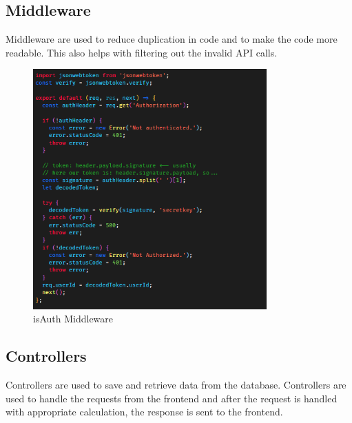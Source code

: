     \subsection{Middleware}
        Middleware are used to reduce duplication in code and to make the code more readable. This also helps with filtering out the invalid API calls.
    \begin{figure}[h]
        \centering
        \includegraphics[width=0.8\textwidth]{images/isAuth.png}
        \caption{isAuth Middleware}
        \label{fig:isAuth}
    \end{figure}

    \pagebreak

    \subsection{Controllers}
    Controllers are used to save and retrieve data from the database. Controllers are used to handle the requests from the frontend and after the request is handled with appropriate calculation, the response is sent to the frontend.

